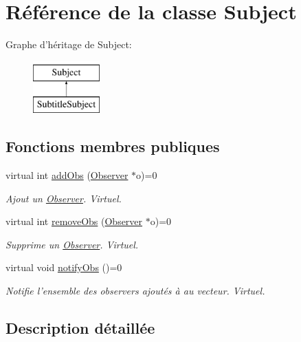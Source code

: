 \hypertarget{classSubject}{\section{Référence de la classe Subject}
\label{classSubject}
}
Graphe d'héritage de Subject\+:\begin{figure}[H]
\begin{center}
\leavevmode
\includegraphics[height=2.000000cm]{classSubject}
\end{center}
\end{figure}
\subsection*{Fonctions membres publiques}
\begin{DoxyCompactItemize}
\item 
virtual int \hyperlink{classSubject_aecac0cb2c69c2d18db0e9433f580bde7}{add\+Obs} (\hyperlink{classObserver}{Observer} $\ast$o)=0
\begin{DoxyCompactList}\small\item\em Ajout un \hyperlink{classObserver}{Observer}. Virtuel. \end{DoxyCompactList}\item 
virtual int \hyperlink{classSubject_a4455d35d683c0005035121c7442b3a55}{remove\+Obs} (\hyperlink{classObserver}{Observer} $\ast$o)=0
\begin{DoxyCompactList}\small\item\em Supprime un \hyperlink{classObserver}{Observer}. Virtuel. \end{DoxyCompactList}\item 
\hypertarget{classSubject_a421d620f3f93365bfd57cd1e9165e501}{virtual void \hyperlink{classSubject_a421d620f3f93365bfd57cd1e9165e501}{notify\+Obs} ()=0}\label{classSubject_a421d620f3f93365bfd57cd1e9165e501}

\begin{DoxyCompactList}\small\item\em Notifie l'ensemble des observers ajoutés à au vecteur. Virtuel. \end{DoxyCompactList}\end{DoxyCompactItemize}


\subsection{Description détaillée}



